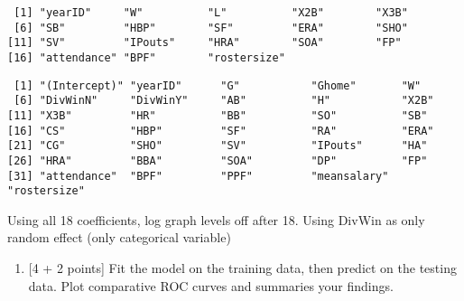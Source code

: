 \documentclass[
]{article}
\newenvironment{Shaded}{\begin{snugshade}}{\end{snugshade}}
\newcommand{\AttributeTok}[1]{\textcolor[rgb]{0.77,0.63,0.00}{#1}}
\newcommand{\DecValTok}[1]{\textcolor[rgb]{0.00,0.00,0.81}{#1}}
\newcommand{\FunctionTok}[1]{\textcolor[rgb]{0.00,0.00,0.00}{#1}}
\newcommand{\NormalTok}[1]{#1}
\newcommand{\OtherTok}[1]{\textcolor[rgb]{0.56,0.35,0.01}{#1}}
\newcommand{\SpecialCharTok}[1]{\textcolor[rgb]{0.00,0.00,0.00}{#1}}
\providecommand{\tightlist}{%
  \setlength{\itemsep}{0pt}\setlength{\parskip}{0pt}}
\begin{document}
\begin{verbatim}
 [1] "yearID"     "W"          "L"          "X2B"        "X3B"       
 [6] "SB"         "HBP"        "SF"         "ERA"        "SHO"       
[11] "SV"         "IPouts"     "HRA"        "SOA"        "FP"        
[16] "attendance" "BPF"        "rostersize"
\end{verbatim}

\begin{Shaded}
\end{Shaded}

\begin{verbatim}
 [1] "(Intercept)" "yearID"      "G"           "Ghome"       "W"          
 [6] "DivWinN"     "DivWinY"     "AB"          "H"           "X2B"        
[11] "X3B"         "HR"          "BB"          "SO"          "SB"         
[16] "CS"          "HBP"         "SF"          "RA"          "ERA"        
[21] "CG"          "SHO"         "SV"          "IPouts"      "HA"         
[26] "HRA"         "BBA"         "SOA"         "DP"          "FP"         
[31] "attendance"  "BPF"         "PPF"         "meansalary"  "rostersize" 
\end{verbatim}

Using all 18 coefficients, log graph levels off after 18. Using DivWin
as only random effect (only categorical variable)

\begin{enumerate}
\def\labelenumi{\alph{enumi}.}
\setcounter{enumi}{4}
\tightlist
\item
  {[}4 + 2 points{]} Fit the model on the training data, then predict on
  the testing data. Plot comparative ROC curves and summaries your
  findings.
\end{enumerate}
\end{document}
